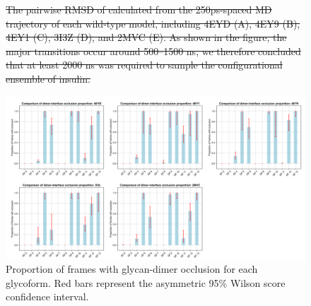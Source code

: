 \documentclass[9pt]{elife}
\providecommand{\DIFdeltex}[1]{{\protect\color{red}\sout{#1}}}                      %
\providecommand{\DIFaddbegin}{} %
\providecommand{\DIFaddend}{} %
\providecommand{\DIFdelFL}[1]{\DIFdel{#1}} %
\providecommand{\DIFdelbeginFL}{} %
\providecommand{\DIFdelendFL}{} %
\providecommand{\DIFdel}[1]{\texorpdfstring{\DIFdeltex{#1}}{}} %
\begin{document}
\renewcommand{\thefigure}{S\arabic{figure}}
\begin{figure}[H]
\centering
\DIFdelbeginFL %
{%
\DIFdelFL{The pairwise RMSD of calculated from the 250ps-spaced MD trajectory of each wild-type model, including 4EYD (A), 4EY9 (B), 4EY1 (C), 3I3Z (D), and 2MVC (E). As shown in the figure, the major transitions occur around 500--1500 ns, we therefore concluded that at least 2000 ns was required to sample the configurational ensemble of insulin.}}

\DIFdelendFL \includegraphics[width=1.0\textwidth]{Figures/occlusion_proportion_models_2.png}
\caption{Proportion of frames with glycan-dimer occlusion for each glycoform. Red bars represent the asymmetric 95\% Wilson score confidence interval.}
\label{supple_fig: occlusion_binomial}
\end{figure}
\DIFaddbegin 


\DIFaddend 
\end{document}
